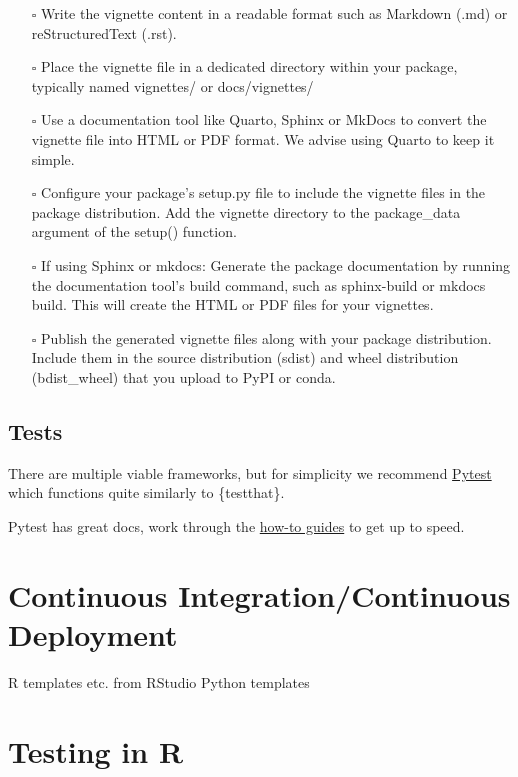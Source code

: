 \documentclass[
  letterpaper,
  DIV=11,
  numbers=noendperiod]{scrreprt}
\providecommand{\tightlist}{%
  \setlength{\itemsep}{0pt}\setlength{\parskip}{0pt}}\usepackage{longtable,booktabs,array}
\begin{document}
\begin{itemize}
\tightlist
\item[$\square$]
  Write the vignette content in a readable format such as Markdown (.md)
  or reStructuredText (.rst).
\item[$\square$]
  Place the vignette file in a dedicated directory within your package,
  typically named vignettes/ or docs/vignettes/
\item[$\square$]
  Use a documentation tool like Quarto, Sphinx or MkDocs to convert the
  vignette file into HTML or PDF format. We advise using Quarto to keep
  it simple.
\item[$\square$]
  Configure your package's setup.py file to include the vignette files
  in the package distribution. Add the vignette directory to the
  package\_data argument of the setup() function.
\item[$\square$]
  If using Sphinx or mkdocs: Generate the package documentation by
  running the documentation tool's build command, such as sphinx-build
  or mkdocs build. This will create the HTML or PDF files for your
  vignettes.
\item[$\square$]
  Publish the generated vignette files along with your package
  distribution. Include them in the source distribution (sdist) and
  wheel distribution (bdist\_wheel) that you upload to PyPI or conda.
\end{itemize}

\section{Tests}\label{tests-1}

There are multiple viable frameworks, but for simplicity we recommend
\href{https://docs.pytest.org/en/stable/contents.html}{Pytest} which
functions quite similarly to \{testthat\}.

Pytest has great docs, work through the
\href{https://docs.pytest.org/en/stable/how-to/index.html}{how-to
guides} to get up to speed.

\chapter{Continuous Integration/Continuous
Deployment}\label{continuous-integrationcontinuous-deployment}

R templates etc. from RStudio Python templates

\chapter{Testing in R}\label{testing-in-r}
\end{document}
